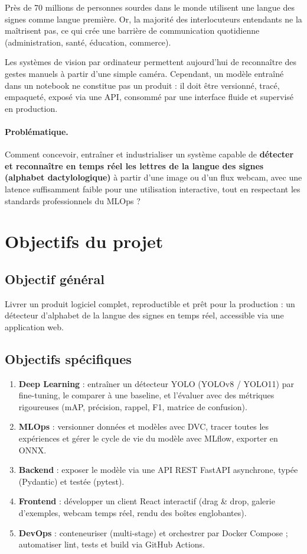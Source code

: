 \documentclass[11pt,a4paper]{article}
\begin{document}
Près de 70 millions de personnes sourdes dans le monde utilisent une langue des signes comme langue première. Or, la majorité des interlocuteurs entendants ne la maîtrisent pas, ce qui crée une barrière de communication quotidienne (administration, santé, éducation, commerce).

Les systèmes de vision par ordinateur permettent aujourd'hui de reconnaître des gestes manuels à partir d'une simple caméra. Cependant, un modèle entraîné dans un notebook ne constitue pas un produit : il doit être versionné, tracé, empaqueté, exposé via une API, consommé par une interface fluide et supervisé en production.

\paragraph{Problématique.} Comment concevoir, entraîner et industrialiser un système capable de \textbf{détecter et reconnaître en temps réel les lettres de la langue des signes (alphabet dactylologique)} à partir d'une image ou d'un flux webcam, avec une latence suffisamment faible pour une utilisation interactive, tout en respectant les standards professionnels du MLOps ?

\section{Objectifs du projet}

\subsection{Objectif général}
Livrer un produit logiciel complet, reproductible et prêt pour la production : un détecteur d'alphabet de la langue des signes en temps réel, accessible via une application web.

\subsection{Objectifs spécifiques}
\begin{enumerate}[leftmargin=*]
  \item \textbf{Deep Learning} : entraîner un détecteur YOLO (YOLOv8 / YOLO11) par fine-tuning, le comparer à une baseline, et l'évaluer avec des métriques rigoureuses (mAP, précision, rappel, F1, matrice de confusion).
  \item \textbf{MLOps} : versionner données et modèles avec DVC, tracer toutes les expériences et gérer le cycle de vie du modèle avec MLflow, exporter en ONNX.
  \item \textbf{Backend} : exposer le modèle via une API REST FastAPI asynchrone, typée (Pydantic) et testée (pytest).
  \item \textbf{Frontend} : développer un client React interactif (drag \& drop, galerie d'exemples, webcam temps réel, rendu des boîtes englobantes).
  \item \textbf{DevOps} : conteneuriser (multi-stage) et orchestrer par Docker Compose ; automatiser lint, tests et build via GitHub Actions.
\end{enumerate}
\end{document}
